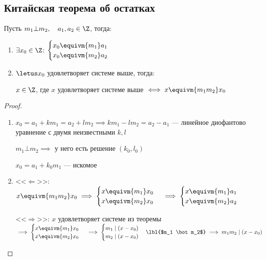 \subsection{Китайская теорема об остатках}

\begin{theorem}
    Пусть $m_1 \bot m_2,\quad a_1, a_2 \in \Z$, тогда:

    \begin{enumerate}
        \item $\exists x_0 \in \Z$: 
        $\begin{cases}
            x_0 \equivm{m_1} a_1 \\
            x_0 \equivm{m_2} a_2
        \end{cases}$
        
        \item $\letus x_0$ удовлетворяет системе выше, тогда:
        
        $x \in \Z$, где $x$ удовлетворяет системе выше $\iff x \equivm{m_1 m_2} x_0$
    \end{enumerate}
\end{theorem}

\begin{proof}
    \begin{enumerate}
        \item $x_0 = a_1 + km_1 = a_2 + lm_2 \implies km_1 - lm_2 = a_2 - a_1$ --- линейное диофантово уравнение с двумя неизвестными $k, l$
        
        $m_1 \bot m_2 \implies$ у него есть решение $(k_0, l_0)$
        
        $x_0 = a_1 + k_0 m_1$ --- искомое

        \item
        <<$\Leftarrow$>>:
        $x \equivm{m_1m_2} x_0 \implies 
        \begin {cases} 
            x \equivm{m_1} x_0 \\
            x \equivm{m_2} x_0
        \end{cases} \implies
        \begin{cases}
            x \equivm{m_1} a_1 \\
            x \equivm{m_2} a_2
        \end{cases}$

        <<$\Rightarrow$>>:
        $x$ удовлетворяет системе из теоремы $\implies
        \begin {cases} 
            x \equivm{m_1} x_0 \\
            x \equivm{m_2} x_0
        \end{cases} \implies
        \begin{cases}
            m_1 \mid (x - x_0)\\
            m_2 \mid (x - x_0)
        \end{cases} \lbl{$m_1 \bot m_2$}\implies m_1m_2 \mid (x - x_0)$
    \end{enumerate}
\end{proof}


